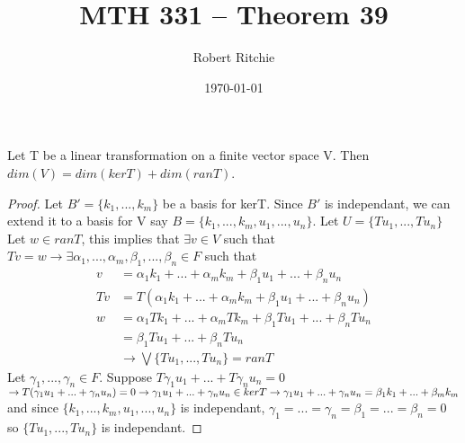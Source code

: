 \documentclass[11pt]{article}
\begin{document}
\author{Robert Ritchie}
\title{MTH 331 -- Theorem 39}
\date{\today}

\maketitle

Let T be a linear transformation on a finite vector space V. Then $dim(V)=dim(kerT)+dim(ranT)$.
\begin{proof} 
Let $B'=\{k_1,...,k_m\}$ be a basis for kerT. Since $B'$ is independant, we can extend it to a basis for V say $B=\{k_1,...,k_m,u_1,...,u_n\}$. 
Let $U=\{Tu_1,...,Tu_n\}$
 Let $w \in ranT$, this implies that $\exists v \in V$ such that $Tv=w \rightarrow \exists \alpha_1,...,\alpha_m,\beta_1,...,\beta_n \in F$ such that
\begin{align*} 
v&=\alpha_1k_1+...+\alpha_mk_m+\beta_1u_1+...+\beta_nu_n\\
Tv&=T(\alpha_1k_1+...+\alpha_mk_m+\beta_1u_1+...+\beta_nu_n) \\
w&=\alpha_1Tk_1+...+\alpha_mTk_m+\beta_1Tu_1+...+\beta_nTu_n \\
&=\beta_1Tu_1+...+\beta_nTu_n \\
 &\rightarrow \bigvee \{Tu_1,...,Tu_n\}=ranT
\end{align*}
Let $\gamma_1,...,\gamma_n \in F$. Suppose
$T\gamma_1u_1+...+T\gamma_nu_n=0$ \\
$ \rightarrow T(\gamma_1u_1+...+\gamma_nu_n)=0 \\
\rightarrow \gamma_1u_1+...+\gamma_nu_n \in kerT \\
 \rightarrow \gamma_1u_1+...+\gamma_nu_n=\beta_1k_1+...+\beta_mk_m$ and since $\{k_1,...,k_m,u_1,...,u_n\}$ is independant, $\gamma_1=...=\gamma_n=\beta_1=...=\beta_n=0$ so $\{Tu_1,...,Tu_n\}$ is independant.
\end{proof}
\end{document}
